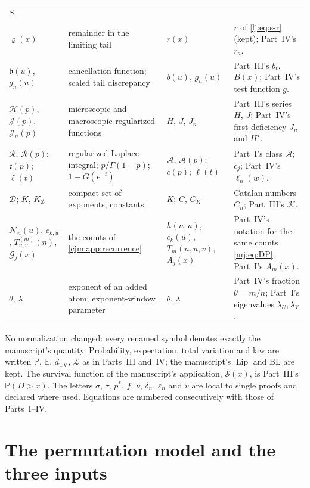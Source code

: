 \documentclass[11pt,a4paper]{article}
\theoremstyle{definition}\newaliascnt{definition}{theorem}
\theoremstyle{remark}\newaliascnt{remark}{theorem}
\newcommand{\Aclass}{\mathcal A}
\newcommand{\ljP}{\mathbb P}
\newcommand{\ljE}{\mathbb E}
\newcommand{\ljTV}{d_{\mathrm{TV}}}
\newcommand{\ljLaw}{\mathcal L}
\newcommand{\ljK}{\mathcal K}
\newcommand{\cjLip}{\operatorname{Lip}}
\newcommand{\cjBL}{\mathrm{BL}}
\begin{document}
\begin{table}[htbp]
\begin{tabular}{>{\raggedright}p{.18\linewidth}>{\raggedright}p{.29\linewidth}>{\raggedright}p{.13\linewidth}>{\raggedright\arraybackslash}p{.28\linewidth}}
 $S$.\\
$\varrho(x)$ & remainder in the limiting tail & $r(x)$ & $r$ of
 \eqref{lj:eq:s-r} (kept); Part~IV's $r_a$.\\
$\mathfrak b(u)$, $g_n(u)$ & cancellation function; scaled tail discrepancy &
 $b(u)$, $g_n(u)$ & Part~III's $b_t$, $B(x)$; Part~IV's test function $g$.\\
$\mathcal H(p)$, $\mathcal J(p)$, $\mathcal J_n(p)$ & microscopic and
 macroscopic regularized functions & $H$, $J$, $J_n$ & Part~III's series
 $H$, $J$; Part~IV's first deficiency $J_n$ and $H^\star$.\\
$\mathcal R$, $\mathcal R(p)$; $\mathfrak c(p)$; $\ell(t)$ & regularized
 Laplace integral; $p/\Gamma(1-p)$; $1-G(e^{-t})$ & $\mathcal A$,
 $\mathcal A(p)$; $c(p)$; $\ell(t)$ & Part~I's class $\Aclass$; $c_j$;
 Part~IV's $\ell_n(w)$.\\
$\mathcal D$; $K$, $K_{\mathcal D}$ & compact set of exponents; constants &
 $K$; $C$, $C_K$ & Catalan numbers $C_n$; Part~III's $\ljK$.\\
$\mathcal N_n(u)$, $c_{k,u}$, $T^{(m)}_{u,v}(n)$, $\mathcal G_j(x)$ &
 the counts of \cref{cjm:app:recurrence} & $h(n,u)$, $c_k(u)$,
 $T_m(n,u,v)$, $A_j(x)$ & Part~IV's notation for the same counts
 \eqref{mj:eq:DP}; Part~I's $A_m(x)$.\\
$\theta$, $\lambda$ & exponent of an added atom; exponent-window parameter
 & $\theta$, $\lambda$ & Part~IV's fraction $\theta=m/n$; Part~I's
 eigenvalues $\lambda_U,\lambda_V$.\\
\bottomrule
\end{tabular}
\end{table}

No normalization changed: every renamed symbol denotes exactly the
manuscript's quantity. Probability, expectation, total variation and law are
written $\ljP$, $\ljE$, $\ljTV$, $\ljLaw$ as in Parts~III and~IV; the
manuscript's $\cjLip$ and $\cjBL$ are kept.
The survival function of the manuscript's application, $\mathcal S(x)$, is
Part~III's $\ljP(D>x)$. The letters $\sigma$, $\tau$, $p^\ast$, $f$, $\nu$,
$\delta_n$, $\varepsilon_n$ and $v$ are local to single proofs and declared
where used. Equations are numbered consecutively with those of Parts~I--IV.

\section{The permutation model and the three inputs}
\label{cjm:sec:inputs}
\end{document}
